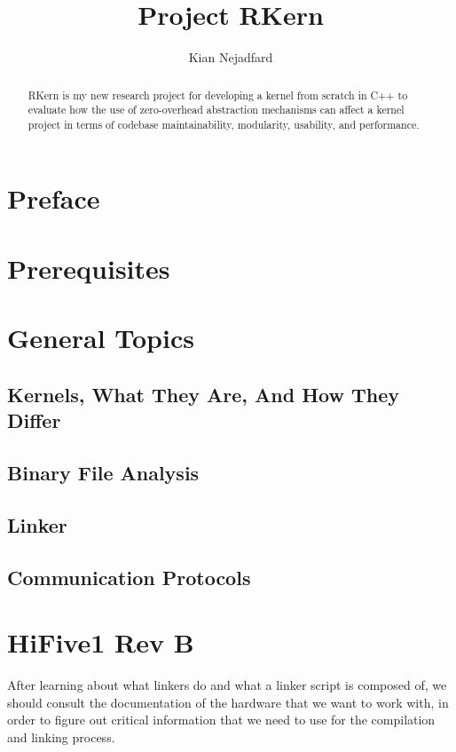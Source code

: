 \documentclass[a4paper,12pt,twoside]{report}
\title{Project RKern}
\author{Kian Nejadfard}
\begin{document}
    \maketitle

    \begin{abstract}
    	RKern is my new research project for developing a kernel from scratch in C++ to evaluate how the use of zero-overhead abstraction mechanisms can affect a kernel project in terms of codebase maintainability, modularity, usability, and performance.
    \end{abstract}

	\chapter{Preface}
        

    \chapter{Prerequisites}
        

    \chapter{General Topics}
        \section{Kernels, What They Are, And How They Differ}
            

        \section{Binary File Analysis}
            

        \section{Linker}
            

        \section{Communication Protocols}
            

    \chapter{HiFive1 Rev B}
        After learning about what linkers do and what a linker script is composed of, we should consult the documentation of the hardware that we want to work with, in order to figure out critical information that we need to use for the compilation and linking process.
\end{document}
